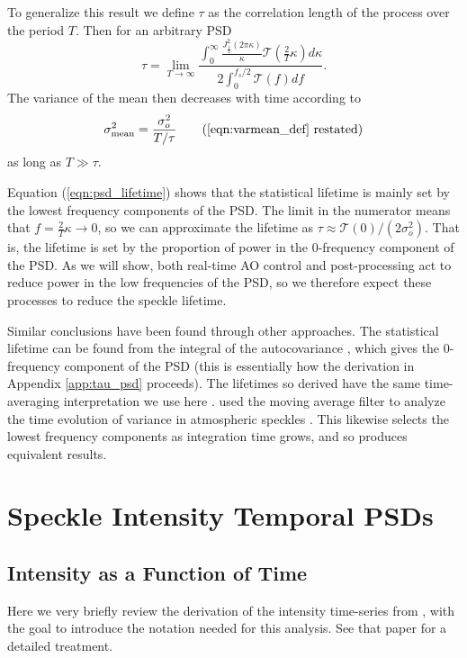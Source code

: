 \documentclass[10pt,preprint]{aastex631}
\begin{document}
To generalize this result we define $\tau$ as the correlation length of the process over the period $T$.  Then for an arbitrary PSD
\begin{equation}
\tau = \lim_{T\to\infty}\frac{ \displaystyle\int_0^{\infty} \frac{ J_{\frac{1}{2}}^2(2\pi \kappa)}{\kappa} \mathcal{T}\left( \frac{2}{T} \kappa \right) d\kappa}{ 2 \displaystyle\int_{0}^{f_s/2} \mathcal{T}(f) df}.
\label{eqn:psd_lifetime}
\end{equation}
The variance of the mean then decreases with time according to
\begin{equation}
\sigma_\mathrm{mean}^2 =  \frac{\sigma_o^2}{T/\tau} \tag{\ref{eqn:varmean_def} restated}
\end{equation}
as long as $T \gg \tau$.

Equation (\ref{eqn:psd_lifetime}) shows that the statistical lifetime is mainly set by the lowest frequency components of the PSD.  The limit in the numerator means that $f = \frac{2}{T}\kappa \rightarrow 0$, so we can approximate the lifetime as $\tau \approx \mathcal{T}(0)/(2\sigma_o^2)$.  That is, the lifetime is set by the proportion of power in the 0-frequency component of the PSD.  As we will show, both real-time AO control and post-processing act to reduce power in the low frequencies of the PSD, so we therefore expect these processes to reduce the speckle lifetime.

Similar conclusions have been found through other approaches.  The statistical lifetime can be found from the integral of the autocovariance \citep{1986JOSAA...3.1001A}, which gives the 0-frequency component of the PSD (this is essentially how the derivation in Appendix \ref{app:tau_psd} proceeds).  The lifetimes so derived have the same time-averaging interpretation we use here \citep{2006ApJ...637..541F}.  \citet{2006OExpr..14.7499P} used the moving average filter to analyze the time evolution of variance in atmospheric speckles \citep[see also][]{2005SPIE.5903..170M}.  This likewise selects the lowest frequency components as integration time grows, and so produces equivalent results.

\section{Speckle Intensity Temporal PSDs}
\label{sec:intensity}
\subsection{Intensity as a Function of Time}
Here we very briefly review the derivation of the intensity time-series from \citet{2018JATIS...4a9001M}, with the goal to introduce the notation needed for this analysis.  See that paper for a detailed treatment.
\end{document}
